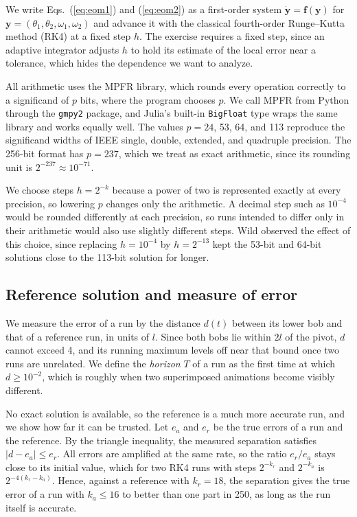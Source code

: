 \documentclass[prb,reprint,amsmath,amssymb,longbibliography]{revtex4-1}
\begin{document}
We write Eqs.~(\ref{eq:eom1}) and (\ref{eq:eom2}) as a first-order system
$\dot{\bm y}=\bm f(\bm y)$ for $\bm y=(\theta_1,\theta_2,\omega_1,\omega_2)$ and
advance it with the classical fourth-order Runge--Kutta method (RK4) at a fixed
step $h$. The exercise requires a fixed step, since an adaptive integrator
adjusts $h$ to hold its estimate of the local error near a tolerance, which
hides the dependence we want to analyze.

All arithmetic uses the MPFR library,\cite{fousse2007} which rounds every
operation correctly to a significand of $p$ bits, where the program chooses
$p$. We call MPFR from Python through the \texttt{gmpy2} package, and Julia's
built-in \texttt{BigFloat} type wraps the same library and works equally well.
The values $p=24$, 53, 64, and 113 reproduce the significand widths of IEEE
single, double, extended, and quadruple precision.\cite{ieee754,goldberg1991} The
256-bit format has $p=237$, which we treat as exact arithmetic, since its
rounding unit is $2^{-237}\approx10^{-71}$.

We choose steps $h=2^{-k}$ because a power of two is represented exactly at
every precision, so lowering $p$ changes only the arithmetic. A decimal step
such as $10^{-4}$ would be rounded differently at each precision, so runs
intended to differ only in their arithmetic would also use slightly different
steps. Wild\cite{wild2019} observed the effect of this choice, since replacing
$h=10^{-4}$ by $h=2^{-13}$ kept the 53-bit and 64-bit solutions close to the
113-bit solution for longer.

\subsection{Reference solution and measure of error}

We measure the error of a run by the distance $d(t)$ between its lower bob and
that of a reference run, in units of $l$. Since both bobs lie within $2l$ of the
pivot, $d$ cannot exceed 4, and its running maximum levels off near that bound
once two runs are unrelated. We define the
\emph{horizon} $T$ of a run as the first time at which $d\ge10^{-2}$, which is
roughly when two superimposed animations become visibly different.

No exact solution is available, so the reference is a much more accurate run,
and we show how far it can be trusted. Let $e_a$ and $e_r$ be the true errors of
a run and the reference. By the triangle inequality, the measured separation
satisfies $|d-e_a|\le e_r$. All errors are amplified at the same rate, so the
ratio $e_r/e_a$ stays close to its initial value, which for two RK4 runs with
steps $2^{-k_r}$ and $2^{-k_a}$ is $2^{-4(k_r-k_a)}$. Hence, against a reference
with $k_r=18$, the separation gives the true error of a run with $k_a\le16$ to
better than one part in 250, as long as the run itself is accurate.
\end{document}
